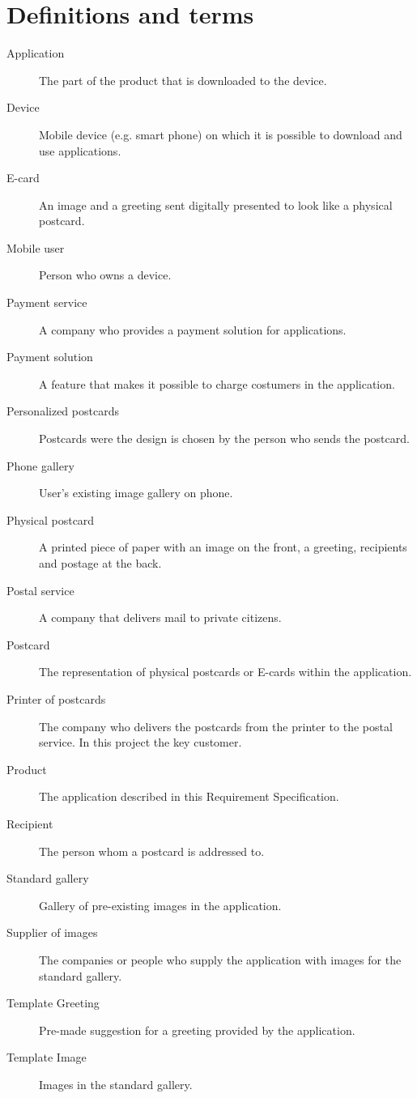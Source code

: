 \documentclass[10pt,a4paper]{article}
\begin{document}

\section{Definitions and terms}
\begin{description}
\item [Application] The part of the product that is downloaded to the device.
\item[Device] Mobile device (e.g. smart phone) on which it is possible to download and use applications.
\item [E-card] An image and a greeting sent digitally presented to look like a physical postcard.
\item[Mobile user] Person who owns a device. 
\item[Payment service] A company who provides a payment solution for applications. 
\item[Payment solution] A feature that makes it possible to charge costumers in the application. 
\item[Personalized postcards] Postcards were the design is chosen by the person who sends the postcard. 
\item[Phone gallery] User's existing image gallery on phone.
\item [Physical postcard] A printed piece of paper with an image on the front, a greeting, recipients and postage at the back. 
\item[Postal service] A company that delivers mail to private citizens.
\item [Postcard] The representation of physical postcards or E-cards within the application. 
\item[Printer of postcards] The company who delivers the postcards from the printer to the postal service. In this project the key customer.
\item[Product]The application described in this Requirement Specification.
\item[Recipient]The person whom a postcard is addressed to.
\item[Standard gallery] Gallery of pre-existing images in the application.
\item[Supplier of images] The companies or people who supply the application with images for the standard gallery.
\item [Template Greeting] Pre-made suggestion for a greeting provided by the application. 
\item [Template Image] Images in the standard gallery. 
\end{description}
\end{document}
